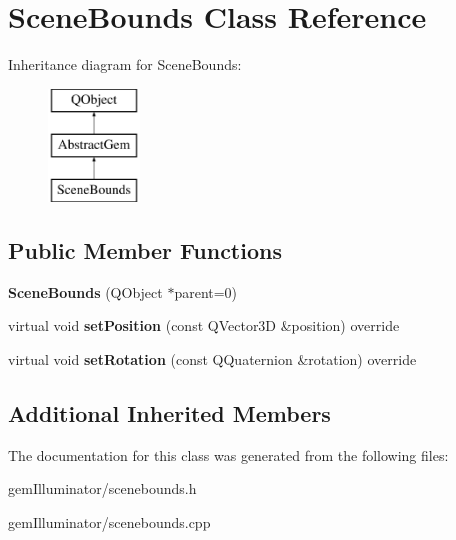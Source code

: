 \hypertarget{class_scene_bounds}{}\section{Scene\+Bounds Class Reference}
\label{class_scene_bounds}
Inheritance diagram for Scene\+Bounds\+:\begin{figure}[H]
\begin{center}
\leavevmode
\includegraphics[height=3.000000cm]{class_scene_bounds}
\end{center}
\end{figure}
\subsection*{Public Member Functions}
\begin{DoxyCompactItemize}
\item 
\hypertarget{class_scene_bounds_a26e24012c6a45d3412745828b037dae4}{}{\bfseries Scene\+Bounds} (Q\+Object $\ast$parent=0)\label{class_scene_bounds_a26e24012c6a45d3412745828b037dae4}

\item 
\hypertarget{class_scene_bounds_a26db5e7928d3ac7d0257dc52e1ed4e77}{}virtual void {\bfseries set\+Position} (const Q\+Vector3\+D \&position) override\label{class_scene_bounds_a26db5e7928d3ac7d0257dc52e1ed4e77}

\item 
\hypertarget{class_scene_bounds_a2e7b2f2e66700b414584ca6b407faf72}{}virtual void {\bfseries set\+Rotation} (const Q\+Quaternion \&rotation) override\label{class_scene_bounds_a2e7b2f2e66700b414584ca6b407faf72}

\end{DoxyCompactItemize}
\subsection*{Additional Inherited Members}


The documentation for this class was generated from the following files\+:\begin{DoxyCompactItemize}
\item 
gem\+Illuminator/scenebounds.\+h\item 
gem\+Illuminator/scenebounds.\+cpp\end{DoxyCompactItemize}
